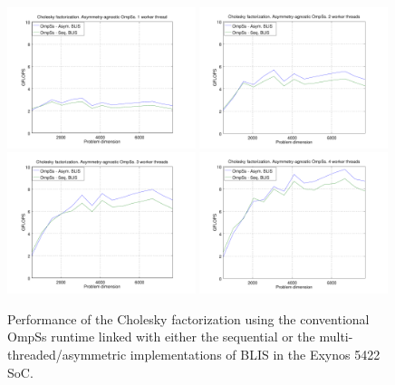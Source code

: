 \begin{figure}%
\centering
\includegraphics[width=0.49\textwidth]{Plots/Orig_runtime/plot_1_th}
\includegraphics[width=0.49\textwidth]{Plots/Orig_runtime/plot_2_th}
\includegraphics[width=0.49\textwidth]{Plots/Orig_runtime/plot_3_th}
\includegraphics[width=0.49\textwidth]{Plots/Orig_runtime/plot_4_th}
\caption{Performance of the Cholesky factorization using the conventional OmpSs runtime linked with either
         the sequential or the multi-threaded/asymmetric implementations of
         BLIS %
         in the Exynos 5422 SoC.}
\label{fig:ompss_blis}
\end{figure}


